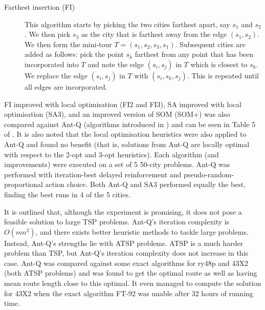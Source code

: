 \begin{description}
    \item[Farthest insertion (FI)] This algorithm \cite{nicholson1967sequential} starts by picking the two cities farthest apart, say $s_1$ and $s_2$. We then pick $s_3$ as the city that is farthest away from the edge $(s_1, s_2)$. We then form the mini-tour $T = (s_1, s_2, s_3, s_1)$. Subsequent cities are added as follows: pick the point $s_k$ farthest from any point that has been incorporated into $T$ and note the edge $(s_i, s_j)$ in $T$ which is closest to $s_k$. We replace the edge $(s_i, s_j)$ in $T$ with $(s_i, s_k, s_j)$. This is repeated until all edges are incorporated. 
\end{description}

FI improved with local optimisation (FI2 and FI3), SA improved with local optimisation (SA3), and an improved version of SOM (SOM+) was also compared against Ant-Q (algorithms introduced in \cite{lin1965computer}) and can be seen in Table 5 of \cite{gambardella1995ant}. It is also noted that the local optimisation heuristics were also applied to Ant-Q and found no benefit (that is, solutions from Ant-Q are locally optimal with respect to the 2-opt and 3-opt heuristics). Each algorithm (and improvements) were executed on a set of 5 50-city problems. Ant-Q was performed with iteration-best delayed reinforcement and pseudo-random-proportional action choice. Both Ant-Q and SA3 performed equally the best, finding the best runs in 4 of the 5 cities.

It is outlined that, although the experiment is promising, it does not pose a feasible solution to large TSP problems. Ant-Q's iteration complexity is $O(mn^2)$, and there exists better heuristic methods to tackle large problems. Instead, Ant-Q's strengths lie with ATSP problems. ATSP is a much harder problem than TSP, but Ant-Q's iteration complexity does not increase in this case. Ant-Q was compared against some exact algorithms for ry48p and 43X2 (both ATSP problems) and was found to get the optimal route as well as having mean route length close to this optimal. It even managed to compute the solution for 43X2 when the exact algorithm FT-92 was unable after 32 hours of running time. 
